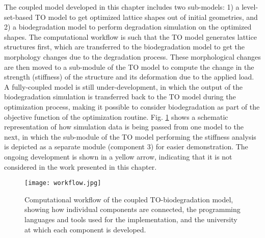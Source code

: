 The coupled model developed in this chapter includes two sub-models: 1) a level-set-based \gls{TO} model to get optimized lattice shapes out of initial geometries, and 2) a biodegradation model to perform degradation simulation on the optimized shapes. The computational workflow is such that the \gls{TO} model generates lattice structures first, which are transferred to the biodegradation model to get the morphology changes due to the degradation process. These morphological changes are then moved to a sub-module of the \gls{TO} model to compute the change in the strength (stiffness) of the structure and its deformation due to the applied load. A fully-coupled model is still under-development, in which the output of the biodegradation simulation is transferred back to the \gls{TO} model during the optimization process, making it possible to consider biodegradation as part of the objective function of the optimization routine. Fig. \ref{fig:infill_workflow} shows a schematic representation of how simulation data is being passed from one model to the next, in which the sub-module of the \gls{TO} model performing the stiffness analysis is depicted as a separate module (component 3) for easier demonstration. The ongoing development is shown in a yellow arrow, indicating that it is not considered in the work presented in this chapter.

\begin{figure}[h]
\centering
\medskip
\texttt{[image: workflow.jpg]}
\caption[Computational workflow of the coupled TO-biodegradation model]{Computational workflow of the coupled \gls{TO}-biodegradation model, showing how individual components are connected, the programming languages and tools used for the implementation, and the university at which each component is developed.} \label{fig:infill_workflow}
\end{figure}

